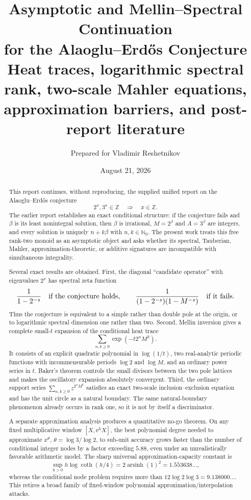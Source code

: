 \documentclass[11pt,oneside]{article}
\title{\vspace{-1.2cm}\textbf{Asymptotic and Mellin--Spectral Continuation\\
for the Alaoglu--Erd\H{o}s Conjecture}\\[0.55em]
\large Heat traces, logarithmic spectral rank, two-scale Mahler equations,\\
approximation barriers, and post-report literature}
\author{Prepared for Vladimir Reshetnikov}
\date{August 21, 2026}
\theoremstyle{definition}
\theoremstyle{remark}
\newcommand{\Nzero}{\mathbb N_0}
\newcommand{\Z}{\mathbb Z}
\newcommand{\asinh}{\operatorname{arsinh}}
\newcommand{\e}{\mathrm e}
\begin{document}
\maketitle

\begin{abstract}
This report continues, without reproducing, the supplied unified report on the Alaoglu--Erd\H{o}s conjecture
\[
  2^x,3^x\in\Z \quad\Longrightarrow\quad x\in\Z.
\]
The earlier report establishes an exact conditional structure: if the conjecture fails and $\beta$ is its least nonintegral solution, then $\beta$ is irrational, $M=2^\beta$ and $A=3^\beta$ are integers, and every solution is uniquely $n+k\beta$ with $n,k\in\Nzero$.  The present work treats this free rank-two monoid as an asymptotic object and asks whether its spectral, Tauberian, Mahler, approximation-theoretic, or additive signatures are incompatible with simultaneous integrality.

Several exact results are obtained.  First, the diagonal ``candidate operator'' with eigenvalues $2^x$ has spectral zeta function
\[
  \frac1{1-2^{-s}}
  \quad\hbox{if the conjecture holds},
  \qquad
  \frac1{(1-2^{-s})(1-M^{-s})}
  \quad\hbox{if it fails}.
\]
Thus the conjecture is equivalent to a simple rather than double pole at the origin, or to logarithmic spectral dimension one rather than two.  Second, Mellin inversion gives a complete small-$t$ expansion of the conditional heat trace
\[
  \sum_{n,k\ge0}\exp(-t2^nM^k).
\]
It consists of an explicit quadratic polynomial in $\log(1/t)$, two real-analytic periodic functions with incommensurable periods $\log2$ and $\log M$, and an ordinary power series in $t$.  Baker's theorem controls the small divisors between the two pole lattices and makes the oscillatory expansion absolutely convergent.  Third, the ordinary support series $\sum_{n,k\ge0}z^{2^nM^k}$ satisfies an exact two-scale inclusion--exclusion equation and has the unit circle as a natural boundary.  The same natural-boundary phenomenon already occurs in rank one, so it is not by itself a discriminator.

A separate approximation analysis produces a quantitative no-go theorem.  On any fixed multiplicative window $[X,\e^hX]$, the best polynomial degree needed to approximate $x^\theta$, $\theta=\log3/\log2$, to sub-unit accuracy grows faster than the number of conditional integer nodes by a factor exceeding $5.88$, even under an unrealistically favorable arithmetic model.  The sharp universal approximation-capacity constant is
\[
  \sup_{h>0}h\log\coth(h/4)=2\asinh(1)^2=1.553638\ldots,
\]
whereas the conditional node problem requires more than $12\log2\log3=9.138000\ldots$.  This retires a broad family of fixed-window polynomial approximation/interpolation attacks.


\end{abstract}
\end{document}
